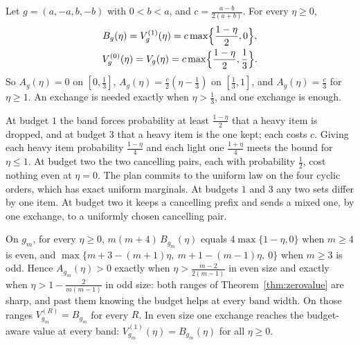 \begin{theorem}
\label{thm:fourrecourse}
Let $g=(a,-a,b,-b)$ with $0<b<a$, and $c=\frac{a-b}{2(a+b)}$. For every $\eta\ge0$,
\begin{gather*}
B_{g}(\eta)=V^{(1)}_{g}(\eta)=c\max\Bigl\{\frac{1-\eta}2,0\Bigr\},\\
V^{(0)}_{g}(\eta)=V_{g}(\eta)=c\max\Bigl\{\frac{1-\eta}2,\frac13\Bigr\}.
\end{gather*}
So $A_{g}(\eta)=0$ on $[0,\frac13]$, $A_g(\eta)=\frac c2(\eta-\frac13)$ on $[\frac13,1]$, and
$A_g(\eta)=\frac c3$ for $\eta\ge1$. An exchange is needed exactly when $\eta>\frac13$, and one
exchange is enough.
\end{theorem}

At budget $1$ the band forces probability at least $\frac{1-\eta}2$ that a heavy item is dropped,
and at budget $3$ that a heavy item is the one kept; each costs $c$. Giving each heavy item
probability $\frac{1-\eta}4$ and each light one $\frac{1+\eta}4$ meets the bound for $\eta\le1$. At budget two
the two cancelling pairs, each with probability $\frac12$, cost nothing even at $\eta=0$. The
plan commits to the uniform law on the four cyclic orders, which has exact uniform marginals.
At budgets $1$ and $3$ any two sets differ by one item. At budget two it keeps a cancelling
prefix and sends a mixed one, by one exchange, to a uniformly chosen cancelling pair.

\begin{theorem}
\label{thm:awareexact}
On $g_m$, for every $\eta\ge0$, $m(m+4)\,B_{g_m}(\eta)$ equals $4\max\{1-\eta,0\}$ when $m\ge4$ is
even, and $\max\{m+3-(m+1)\eta,\ m+1-(m-1)\eta,\ 0\}$ when $m\ge3$ is odd. Hence $A_{g_m}(\eta)>0$ exactly when $\eta>\frac{m-2}{2(m-1)}$ in even size and exactly when
$\eta>1-\frac2{m(m-1)}$ in odd size: both ranges of Theorem~\ref{thm:zerovalue} are sharp, and
past them knowing the budget helps at every band width. On those ranges $V^{(R)}_{g_m}=B_{g_m}$ for
every $R$. In even size one exchange reaches the budget-aware value at every band:
$V^{(1)}_{g_m}(\eta)=B_{g_m}(\eta)$ for all $\eta\ge0$.
\end{theorem}

